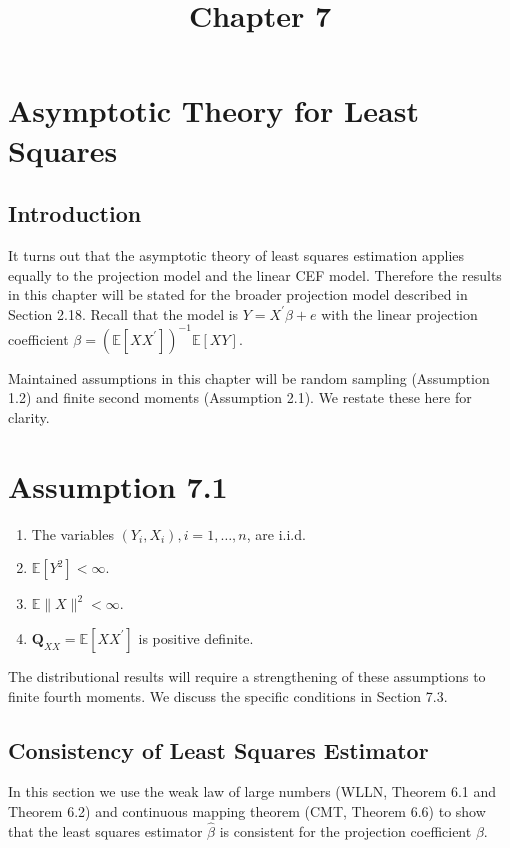 \documentclass[10pt]{article}
\title{Chapter 7 }
\author{}
\date{}
\begin{document}
\maketitle
\section{Asymptotic Theory for Least Squares}
\subsection{Introduction}
It turns out that the asymptotic theory of least squares estimation applies equally to the projection model and the linear CEF model. Therefore the results in this chapter will be stated for the broader projection model described in Section 2.18. Recall that the model is $Y=X^{\prime} \beta+e$ with the linear projection coefficient $\beta=\left(\mathbb{E}\left[X X^{\prime}\right]\right)^{-1} \mathbb{E}[X Y]$.

Maintained assumptions in this chapter will be random sampling (Assumption 1.2) and finite second moments (Assumption 2.1). We restate these here for clarity.

\section{Assumption 7.1}
\begin{enumerate}
  \item The variables $\left(Y_{i}, X_{i}\right), i=1, \ldots, n$, are i.i.d.

  \item $\mathbb{E}\left[Y^{2}\right]<\infty$.

  \item $\mathbb{E}\|X\|^{2}<\infty$.

  \item $\boldsymbol{Q}_{X X}=\mathbb{E}\left[X X^{\prime}\right]$ is positive definite.

\end{enumerate}
The distributional results will require a strengthening of these assumptions to finite fourth moments. We discuss the specific conditions in Section 7.3.

\subsection{Consistency of Least Squares Estimator}
In this section we use the weak law of large numbers (WLLN, Theorem 6.1 and Theorem 6.2) and continuous mapping theorem (CMT, Theorem 6.6) to show that the least squares estimator $\widehat{\beta}$ is consistent for the projection coefficient $\beta$.
\end{document}
